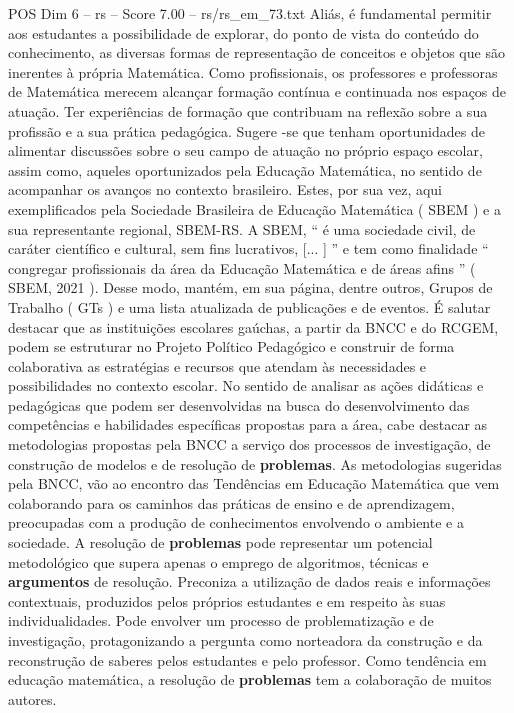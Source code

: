 \begin{textsample}{POS Dim 6 – rs – Score 7.00 – rs/rs\_em\_73.txt}
Aliás, é fundamental permitir aos estudantes a possibilidade de explorar, do ponto de vista do conteúdo do conhecimento, as diversas formas de representação de conceitos e objetos que são inerentes à própria Matemática.
Como profissionais, os professores e professoras de Matemática merecem alcançar formação contínua e continuada nos espaços de atuação.
Ter experiências de formação que contribuam na reflexão sobre a sua profissão e a sua prática pedagógica.
Sugere -se que tenham oportunidades de alimentar discussões sobre o seu campo de atuação no próprio espaço escolar, assim como, aqueles oportunizados pela Educação Matemática, no sentido de acompanhar os avanços no contexto brasileiro.
Estes, por sua vez, aqui exemplificados pela Sociedade Brasileira de Educação Matemática ( SBEM ) e a sua representante regional, SBEM-RS.
A SBEM, “ é uma sociedade civil, de caráter científico e cultural, sem fins lucrativos, [... ] ” e tem como finalidade “ congregar profissionais da área da Educação Matemática e de áreas afins ” ( SBEM, 2021 ).
Desse modo, mantém, em sua página, dentre outros, Grupos de Trabalho ( GTs ) e uma lista atualizada de publicações e de eventos.
É salutar destacar que as instituições escolares gaúchas, a partir da BNCC e do RCGEM, podem se estruturar no Projeto Político Pedagógico e construir de forma colaborativa as estratégias e recursos que atendam às necessidades e possibilidades no contexto escolar.
No sentido de analisar as ações didáticas e pedagógicas que podem ser desenvolvidas na busca do desenvolvimento das competências e habilidades específicas propostas para a área, cabe destacar as metodologias propostas pela BNCC a serviço dos processos de investigação, de construção de modelos e de resolução de \textbf{problemas}.
As metodologias sugeridas pela BNCC, vão ao encontro das Tendências em Educação Matemática que vem colaborando para os caminhos das práticas de ensino e de aprendizagem, preocupadas com a produção de conhecimentos envolvendo o ambiente e a sociedade.
A resolução de \textbf{problemas} pode representar um potencial metodológico que supera apenas o emprego de algoritmos, técnicas e \textbf{argumentos} de resolução.
Preconiza a utilização de dados reais e informações contextuais, produzidos pelos próprios estudantes e em respeito às suas individualidades.
Pode envolver um processo de problematização e de investigação, protagonizando a pergunta como norteadora da construção e da reconstrução de saberes pelos estudantes e pelo professor.
Como tendência em educação matemática, a resolução de \textbf{problemas} tem a colaboração de muitos autores.

\end{textsample}
